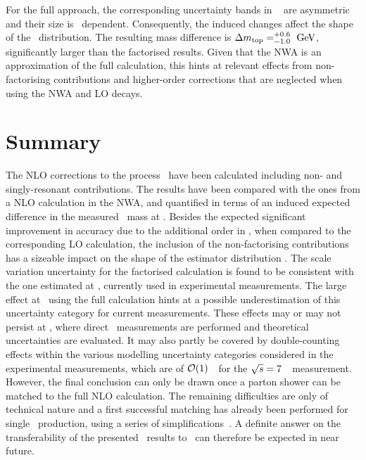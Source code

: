 %
For the full approach, the corresponding uncertainty bands in \fig~ are asymmetric and their size is \mlb\ dependent. Consequently, the induced changes affect the shape of the \mlb\ distribution. The resulting mass difference is $\Delta m_{\mathrm{top}}=^{+0.6}_{-1.0}~\mathrm{GeV}$, significantly larger than the factorised results. 
%
Given that the \gls{NWA} is an approximation of the full calculation, this hints at relevant effects from non-factorising contributions and higher-order corrections that are neglected when using the \gls{NWA} and \gls{LO} decays.
















\section{Summary}
%
The \gls{NLO} corrections to the process \ppWWbb\ have been calculated including non- and singly-resonant contributions. The results have been compared with the ones from a \gls{NLO} calculation in the \gls{NWA}, and quantified in terms of an induced expected difference in the measured \tquark\ mass at \genlevel. 
%
Besides the expected significant improvement in accuracy due to the additional order in \alphas, when compared to the corresponding \gls{LO} calculation, the inclusion of the non-factorising contributions has a sizeable impact on the shape of the estimator distribution \mlb. The scale variation uncertainty for the factorised calculation is found to be consistent with the one estimated at \recolevel, currently used in experimental measurements. The large effect at \genlevel\ using the full calculation hints at a possible underestimation of this uncertainty category for current measurements. 
%
These effects may or may not persist at \recolevel, where direct \mt\ measurements are performed and theoretical uncertainties are evaluated. 
%
It may also partly be covered by double-counting effects within the various modelling uncertainty categories considered in the experimental measurements, which are of $\mathcal O(1)$~\GeV\ for the ${\sqrt{s}}=7$~\TeV\ measurement.
%
However, the final conclusion can only be drawn once a parton shower can be matched to the full \gls{NLO} calculation. The remaining difficulties are only of technical nature and a first successful matching has already been performed for single \tquark\ production, using a series of simplifications~\cite{Jezo:2015aia}. A definite answer on the transferability of the presented \genlevel\ results to \stablevel\ can therefore be expected in near future.
%
